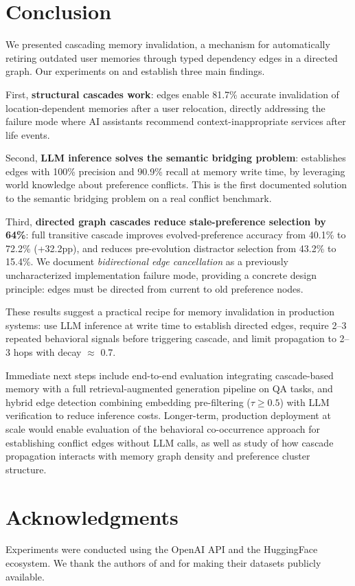 \section{Conclusion}
\label{sec:conclusion}

We presented cascading memory invalidation, a mechanism for automatically retiring outdated user memories through typed dependency edges in a directed graph. Our experiments on \locomo and \horizonbench establish three main findings.

First, \textbf{structural cascades work}: \locatedin edges enable 81.7\% accurate invalidation of location-dependent memories after a user relocation, directly addressing the failure mode where AI assistants recommend context-inappropriate services after life events.

Second, \textbf{LLM inference solves the semantic bridging problem}: \gptfouromini establishes \conflictswith edges with 100\% precision and 90.9\% recall at memory write time, by leveraging world knowledge about preference conflicts. This is the first documented solution to the semantic bridging problem on a real conflict benchmark.

Third, \textbf{directed graph cascades reduce stale-preference selection by 64\%}: full transitive cascade improves evolved-preference accuracy from 40.1\% to 72.2\% (+32.2pp), and reduces pre-evolution distractor selection from 43.2\% to 15.4\%. We document \textit{bidirectional edge cancellation} as a previously uncharacterized implementation failure mode, providing a concrete design principle: \conflictswith edges must be directed from current to old preference nodes.

These results suggest a practical recipe for memory invalidation in production systems: use LLM inference at write time to establish directed \conflictswith edges, require 2--3 repeated behavioral signals before triggering cascade, and limit propagation to 2--3 hops with decay $\approx$ 0.7.

Immediate next steps include end-to-end evaluation integrating cascade-based memory with a full retrieval-augmented generation pipeline on \locomo QA tasks, and hybrid edge detection combining embedding pre-filtering ($\tau \geq 0.5$) with LLM verification to reduce inference costs. Longer-term, production deployment at scale would enable evaluation of the behavioral co-occurrence approach for establishing conflict edges without LLM calls, as well as study of how cascade propagation interacts with memory graph density and preference cluster structure.

\section*{Acknowledgments}
Experiments were conducted using the OpenAI API and the HuggingFace ecosystem. We thank the authors of \locomo and \horizonbench for making their datasets publicly available.
